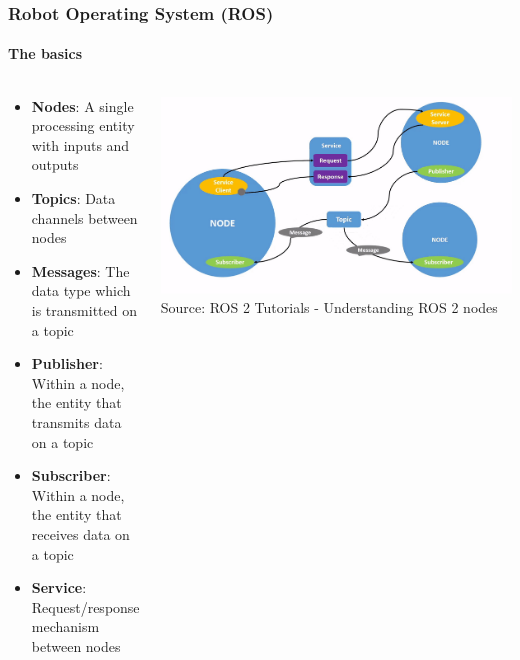 \begin{frame}
\frametitle{Robot Operating System (ROS)}
\framesubtitle{The basics}
\begin{columns}[]
    \begin{column}{0.5\textwidth}
        \begin{itemize}
            \item \textbf{Nodes}: A single processing entity with inputs and
                outputs
            \item \textbf{Topics}: Data channels between nodes
            \item \textbf{Messages}: The data type which is transmitted on a
                topic
            \item \textbf{Publisher}: Within a node, the entity that transmits
                data on a topic
            \item \textbf{Subscriber}: Within a node, the entity that receives
                data on a topic
            \item \textbf{Service}: Request/response mechanism between nodes
        \end{itemize}
    \end{column}
    \begin{column}{0.5\textwidth}
        \centering
        \includegraphics[width=\textwidth]{images/ros_overview.png}
        \tiny{Source: ROS 2 Tutorials - Understanding ROS 2 nodes\footnotemark[1]}
    \end{column}
\end{columns}
\end{frame}

